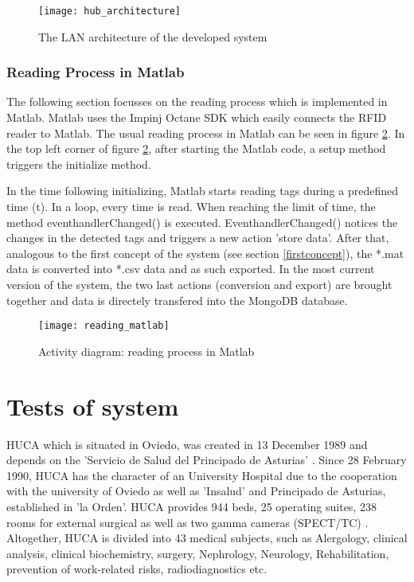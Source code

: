 \begin{figure}
\centering
\texttt{[image: hub\_architecture]} 
\caption{\label{fig:hub_architecture}The LAN architecture of the developed system} 
\end{figure}

\subsubsection{Reading Process in Matlab}

The following section focusses on the reading process which is implemented in Matlab. Matlab uses the Impinj Octane SDK \cite{octanesdk} which easily connects the RFID reader to Matlab. The usual reading process in Matlab can be seen in figure \ref{fig:reading_matlab}. In the top left corner of figure \ref{fig:reading_matlab}, after starting the Matlab code, a setup method triggers the initialize method. 

In the time following initializing, Matlab starts reading tags during a predefined time (t). In a loop, every time is read. When reaching the limit of time, the method eventhandlerChanged() is executed. EventhandlerChanged() notices the changes in the detected tags and triggers a new action 'store data'. After that, analogous to the first concept of the system (see section \ref{firstconcept}), the *.mat data is converted into *.csv data and as such exported. In the most current version of the system, the two last actions (conversion and export) are brought together and data is directely transfered into the MongoDB database. 

\begin{figure}
\centering
\texttt{[image: reading\_matlab]} 
\caption{\label{fig:reading_matlab}Activity diagram: reading process in Matlab} 
\end{figure}

\section{Tests of system} \label{tests}

\ac{HUCA} which is situated in Oviedo, was created in 13 December 1989 and depends on the 'Servicio de Salud del Principado de Asturias' \cite{huca}. Since 28 February 1990, HUCA has the character of an University Hospital due to the cooperation with the university of Oviedo as well as 'Insalud' and Principado de Asturias, established in 'la Orden'. 
HUCA provides 944 beds, 25 operating suites, 238 rooms for external surgical as well as two gamma cameras (\ac{SPECT}/\ac{TC}) \cite{huca}. Altogether, HUCA is divided into 43 medical subjects, such as Alergology, clinical analysis, clinical biochemistry, surgery, Nephrology, Neurology, Rehabilitation, prevention of work-related risks, radiodiagnostics etc. 

